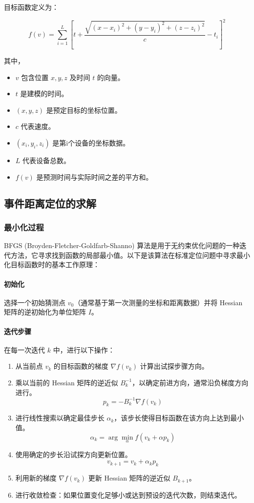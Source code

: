 \documentclass[withoutpreface,bwprint,12pt,a4paper]{cumcmthesis}
\begin{document}
目标函数定义为：

\[ f(v) = \sum_{i=1}^L \left[ t + \frac{\sqrt{(x - x_i)^2 + (y - y_i)^2 + (z - z_i)^2}}{c} - t_i \right]^2 \]

其中，
\begin{itemize}
    \item \( v \) 包含位置 \( x, y, z \) 及时间 \( t \) 的向量。
    \item \( t \) 是建模的时间。
    \item \( (x, y, z) \) 是预定目标的坐标位置。
    \item \( c \) 代表速度。
    \item \( (x_i, y_i, z_i) \) 是第i个设备的坐标数据。
    \item \( L \) 代表设备总数。
    \item \( f(v) \) 是预测时间与实际时间之差的平方和。
\end{itemize}


\subsection{事件距离定位的求解}

\subsubsection{最小化过程}
BFGS (Broyden-Fletcher-Goldfarb-Shanno) 算法是用于无约束优化问题的一种迭代方法，它寻求找到函数的局部最小值。以下是该算法在标准定位问题中寻求最小化目标函数时的基本工作原理：

\paragraph{初始化}  
选择一个初始猜测点 \(v_0\)（通常基于第一次测量的坐标和距离数据）并将 Hessian 矩阵的逆初始化为单位矩阵 \(I\)。

\paragraph{迭代步骤}  
在每一次迭代 \(k\) 中，进行以下操作：

\begin{enumerate}
    \item 从当前点 \(v_k\) 的目标函数的梯度 \(\nabla f(v_k)\) 计算出试探步骤方向。
    \item 乘以当前的 Hessian 矩阵的逆近似 \(B_k^{-1}\)，以确定前进方向，通常沿负梯度方向进行。
    \[
    p_k = -B_k^{-1} \nabla f(v_k)
    \]
    \item 进行线性搜索以确定最佳步长 \(\alpha_k\)，该步长使得目标函数在该方向上达到最小值。
    \[
    \alpha_k = \arg\min_\alpha f(v_k + \alpha p_k)
    \]
    \item 使用确定的步长沿试探方向更新位置。
    \[
    v_{k+1} = v_k + \alpha_k p_k
    \]
    \item 利用新的梯度 \(\nabla f(v_k)\) 更新 Hessian 矩阵的逆近似 \(B_{k+1}\)。
    \item 进行收敛检查：如果位置变化足够小或达到预设的迭代次数，则结束迭代。
\end{enumerate}
\end{document}
